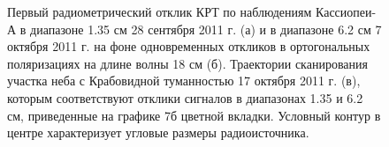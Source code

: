 \begin{figure}[tbh]
 \caption{Первый радиометрический отклик КРТ по наблюдениям Кассиопеи-А
в диапазоне 1.35 см 28 сентября 2011 г. (а)
и в диапазоне 6.2 см 7 октября 2011 г.
на фоне одновременных откликов в ортогональных поляризациях
на длине волны 18 см  (б).
Траектории сканирования участка неба с Крабовидной туманностью
17 октября 2011 г. (в), которым соответствуют отклики
сигналов в диапазонах 1.35 и 6.2 см, приведенные на графике 7б цветной вкладки.
Условный контур в центре характеризует угловые размеры
радиоисточника.}
\end{figure}

